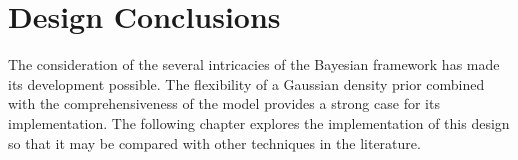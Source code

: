 \section{Design Conclusions}
The consideration of the several intricacies of the Bayesian framework has made its development possible. The flexibility of a Gaussian density prior combined with the comprehensiveness of the model provides a strong case for its implementation. The following chapter explores the implementation of this design so that it may be compared with other techniques in the literature.




